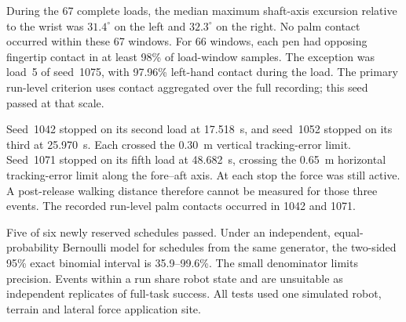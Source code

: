 During the 67 complete loads, the median maximum shaft-axis excursion relative to the wrist was $31.4^\circ$ on the left and $32.3^\circ$ on the right. No palm contact occurred within these 67 windows. For 66 windows, each pen had opposing fingertip contact in at least 98\% of load-window samples. The exception was load~5 of seed~1075, with 97.96\% left-hand contact during the load. The primary run-level criterion uses contact aggregated over the full recording; this seed passed at that scale.

Seed~1042 stopped on its second load at 17.518~s, and seed~1052 stopped on its third at 25.970~s. Each crossed the 0.30~m vertical tracking-error limit. Seed~1071 stopped on its fifth load at 48.682~s, crossing the 0.65~m horizontal tracking-error limit along the fore--aft axis. At each stop the force was still active. A post-release walking distance therefore cannot be measured for those three events. The recorded run-level palm contacts occurred in 1042 and 1071.

Five of six newly reserved schedules passed. Under an independent, equal-probability Bernoulli model for schedules from the same generator, the two-sided 95\% exact binomial interval is 35.9--99.6\%. The small denominator limits precision. Events within a run share robot state and are unsuitable as independent replicates of full-task success. All tests used one simulated robot, terrain and lateral force application site.
